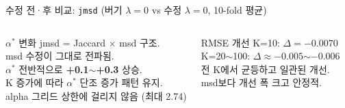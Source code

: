 \documentclass[aspectratio=169,10pt]{beamer}
\begin{document}
\begin{frame}[shrink=20]{수정 전·후 비교: \texttt{jmsd} \textnormal{\small(버기 $\lambda=0$ vs 수정 $\lambda=0$, 10-fold 평균)}}
\begin{columns}[T]
			\begin{block}{$\alpha^*$ 변화}
				\small
				jmsd = Jaccard $\times$ msd 구조.\\msd 수정이 그대로 전파됨.\\
				$\alpha^*$ 전반적으로 \textbf{+0.1$\sim$+0.3} 상승.\\
				K 증가에 따라 $\alpha^*$ 단조 증가 패턴 유지.\\
				alpha 그리드 상한에 걸리지 않음 (최대 2.74)
			\end{block}
			\begin{alertblock}{RMSE 개선}
				\small
				K=10: $\Delta=-0.0070$\\
				K=20$\sim$100: $\Delta\approx-0.005$$\sim-0.006$\\
				전 K에서 균등하고 일관된 개선.\\
				msd보다 개선 폭 크고 안정적.
			\end{alertblock}
	\end{columns}
\end{frame}
\end{document}
